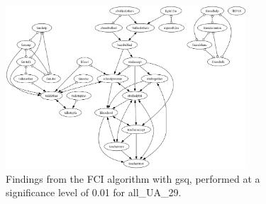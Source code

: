 \begin{figure}[htbp]
    \centering
    \includegraphics[width=0.8\textwidth]{Report/final_report/pictures/FCI_gsq_0.01_all_UA_29.png}
    \caption{Findings from the FCI algorithm with gsq, performed at a significance level of 0.01 for all_UA_29.}
    \label{fig:fci_gsq_0.01all_UA_29}
\end{figure}

